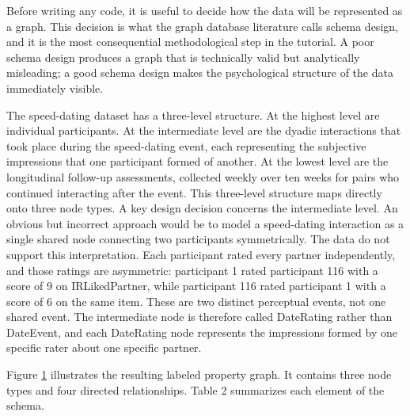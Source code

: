 \documentclass[sn-apa,pdflatex]{sn-jnl}
\theoremstyle{remark}
\theoremstyle{definition}
\begin{document}
Before writing any code, it is useful to decide how the data will be
represented as a graph. This decision is what the graph database
literature calls schema design, and it is the most consequential
methodological step in the tutorial. A poor schema design produces a
graph that is technically valid but analytically misleading; a good
schema design makes the psychological structure of the data immediately
visible.

The speed-dating dataset has a three-level structure. At the highest
level are individual participants. At the intermediate level are the
dyadic interactions that took place during the speed-dating event, each
representing the subjective impressions that one participant formed of
another. At the lowest level are the longitudinal follow-up assessments,
collected weekly over ten weeks for pairs who continued interacting
after the event. This three-level structure maps directly onto three
node types. A key design decision concerns the intermediate level. An
obvious but incorrect approach would be to model a speed-dating
interaction as a single shared node connecting two participants
symmetrically. The data do not support this interpretation. Each
participant rated every partner independently, and those ratings are
asymmetric: participant 1 rated participant 116 with a score of 9 on
IRLikedPartner, while participant 116 rated participant 1 with a score
of 6 on the same item. These are two distinct perceptual events, not one
shared event. The intermediate node is therefore called DateRating
rather than DateEvent, and each DateRating node represents the
impressions formed by one specific rater about one specific partner.

Figure \hyperref[fig:F2]{1} illustrates the resulting labeled property
graph. It contains three node types and four directed relationships.
Table 2 summarizes each element of the schema.
\end{document}
